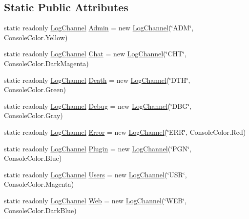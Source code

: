 \subsection*{Static Public Attributes}
\begin{DoxyCompactItemize}
\item 
static readonly \hyperlink{classOTA_1_1Logging_1_1LogChannel}{Log\+Channel} \hyperlink{classOTA_1_1Logging_1_1ProgramLog_a2804b7f6df68fe4b58e35a417b414405}{Admin} = new \hyperlink{classOTA_1_1Logging_1_1LogChannel}{Log\+Channel}(\char`\"{}A\+D\+M\char`\"{}, Console\+Color.\+Yellow)
\item 
static readonly \hyperlink{classOTA_1_1Logging_1_1LogChannel}{Log\+Channel} \hyperlink{classOTA_1_1Logging_1_1ProgramLog_a2865ab616e09f54fcec31fd58c8f1c82}{Chat} = new \hyperlink{classOTA_1_1Logging_1_1LogChannel}{Log\+Channel}(\char`\"{}C\+H\+T\char`\"{}, Console\+Color.\+Dark\+Magenta)
\item 
static readonly \hyperlink{classOTA_1_1Logging_1_1LogChannel}{Log\+Channel} \hyperlink{classOTA_1_1Logging_1_1ProgramLog_a73c297cf7c9d249ad2f648bbeb80755c}{Death} = new \hyperlink{classOTA_1_1Logging_1_1LogChannel}{Log\+Channel}(\char`\"{}D\+T\+H\char`\"{}, Console\+Color.\+Green)
\item 
static readonly \hyperlink{classOTA_1_1Logging_1_1LogChannel}{Log\+Channel} \hyperlink{classOTA_1_1Logging_1_1ProgramLog_a6fe805373eb7bc274e12ee6e1ecbd037}{Debug} = new \hyperlink{classOTA_1_1Logging_1_1LogChannel}{Log\+Channel}(\char`\"{}D\+B\+G\char`\"{}, Console\+Color.\+Gray)
\item 
static readonly \hyperlink{classOTA_1_1Logging_1_1LogChannel}{Log\+Channel} \hyperlink{classOTA_1_1Logging_1_1ProgramLog_a2ad381f478bc6fb2bc44816354471eef}{Error} = new \hyperlink{classOTA_1_1Logging_1_1LogChannel}{Log\+Channel}(\char`\"{}E\+R\+R\char`\"{}, Console\+Color.\+Red)
\item 
static readonly \hyperlink{classOTA_1_1Logging_1_1LogChannel}{Log\+Channel} \hyperlink{classOTA_1_1Logging_1_1ProgramLog_a0a3e9c63b0979f4209ac89d2636b1499}{Plugin} = new \hyperlink{classOTA_1_1Logging_1_1LogChannel}{Log\+Channel}(\char`\"{}P\+G\+N\char`\"{}, Console\+Color.\+Blue)
\item 
static readonly \hyperlink{classOTA_1_1Logging_1_1LogChannel}{Log\+Channel} \hyperlink{classOTA_1_1Logging_1_1ProgramLog_a314574d4ff81cf195929f1e2fa361321}{Users} = new \hyperlink{classOTA_1_1Logging_1_1LogChannel}{Log\+Channel}(\char`\"{}U\+S\+R\char`\"{}, Console\+Color.\+Magenta)
\item 
static readonly \hyperlink{classOTA_1_1Logging_1_1LogChannel}{Log\+Channel} \hyperlink{classOTA_1_1Logging_1_1ProgramLog_a084c807d3562967c3d3840cc6751d8c9}{Web} = new \hyperlink{classOTA_1_1Logging_1_1LogChannel}{Log\+Channel}(\char`\"{}W\+E\+B\char`\"{}, Console\+Color.\+Dark\+Blue)
\end{DoxyCompactItemize}
